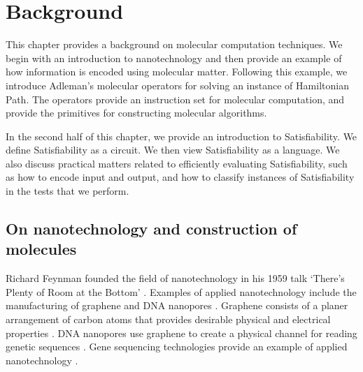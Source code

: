 \chapter{Background}


This chapter provides a background on molecular computation techniques.  We begin with an introduction to nanotechnology and then provide an example of how information is encoded using molecular matter.  Following this example, we introduce Adleman's molecular operators for solving an instance of {\sc Hamiltonian Path}.  The operators provide an instruction set for molecular computation, and provide the primitives for constructing molecular algorithms.

In the second half of this chapter, we provide an introduction to {\sc Satisfiability}.  We define {\sc Satisfiability} as a circuit.  We then view {\sc Satisfiability} as a language.  We also discuss practical matters related to efficiently evaluating {\sc Satisfiability}, such as how to encode input and output, and how to classify instances of {\sc Satisfiability} in the tests that we perform.

\section{On nanotechnology and construction of molecules}

		
	Richard Feynman founded the field of nanotechnology in his 1959 talk `There's Plenty of Room at the Bottom' \cite{feynman1959}.  Examples of applied nanotechnology include the manufacturing of graphene \cite{Stankovich_Dikin_Dommett_Kohlhaas_Zimney_Stach_Piner_Nguyen_Ruoff_2006} and DNA nanopores \cite{dnaTransistorIBMpressrelease}. Graphene consists of a planer arrangement of carbon atoms that provides desirable physical and electrical properties \cite{Stankovich_Dikin_Dommett_Kohlhaas_Zimney_Stach_Piner_Nguyen_Ruoff_2006}.  DNA nanopores use graphene to create a physical channel for reading genetic sequences \cite{Garaj2010}.  Gene sequencing technologies provide an example of applied nanotechnology \cite{Garaj2010, ionTorrent, oxfordNanopore}.  					
		
		
